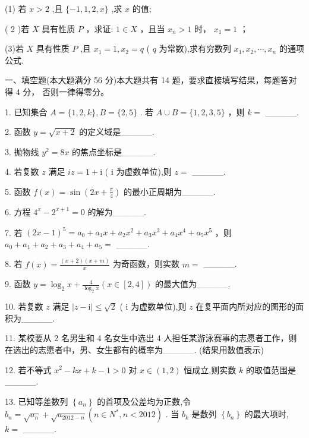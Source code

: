 \documentclass[10pt]{article}
\begin{document}
(1) 若 \(x > 2\) ,且 \(\{  - 1,1,2,x\}\) ,求 \(x\) 的值;

( 2 )若 \(X\) 具有性质 \(P\) ，求证: \(1 \in  X\) ，且当 \({x}_{n} > 1\) 时， \({x}_{1} = 1\) ；

(3)若 \(X\) 具有性质 \(P\) ,且 \({x}_{1} = 1,{x}_{2} = q\) ( \(q\) 为常数),求有穷数列 \({x}_{1},{x}_{2},\cdots ,{x}_{n}\) 的通项公式.

一、填空题(本大题满分 56 分)本大题共有 14 题，要求直接填写结果，每题答对得 4 分， 否则一律得零分。

1. 已知集合 \(A = \{ 1,2,k\} ,B = \{ 2,5\}\) . 若 \(A \cup  B = \{ 1,2,3,5\}\) ，则 \(k =\) \_\_\_\_\_.

2. 函数 \(y = \sqrt{x + 2}\) 的定义域是\_\_\_\_\_.

3. 抛物线 \({y}^{2} = {8x}\) 的焦点坐标是\_\_\_\_\_.

4. 若复数 \(z\) 满足 \({iz} = 1 + \mathrm{i}\) ( \(\mathrm{i}\) 为虚数单位),则 \(z =\) \_\_\_\_\_.

5. 函数 \(f\left( x\right)  = \sin \left( {{2x} + \frac{\pi }{4}}\right)\) 的最小正周期为\_\_\_\_\_.

6. 方程 \({4}^{x} - {2}^{x + 1} = 0\) 的解为\_\_\_\_\_.

7. 若 \({\left( 2x - 1\right) }^{5} = {a}_{0} + {a}_{1}x + {a}_{2}{x}^{2} + {a}_{3}{x}^{3} + {a}_{4}{x}^{4} + {a}_{5}{x}^{5}\) ，则 \({a}_{0} + {a}_{1} + {a}_{2} + {a}_{3} + {a}_{4} + {a}_{5} =\) \_\_\_\_\_.

8. 若 \(f\left( x\right)  = \frac{\left( {x + 2}\right) \left( {x + m}\right) }{x}\) 为奇函数，则实数 \(m =\) \_\_\_\_\_.

9. 函数 \(y = {\log }_{2}x + \frac{4}{{\log }_{2}x}\left( {x \in  \left\lbrack  {2,4}\right\rbrack  }\right)\) 的最大值为\_\_\_\_\_.

10. 若复数 \(z\) 满足 \(\left| {z - \mathrm{i}}\right|  \leq  \sqrt{2}\) ( \(\mathrm{i}\) 为虚数单位),则 \(z\) 在复平面内所对应的图形的面积为\_\_\_\_\_.

11. 某校要从 2 名男生和 4 名女生中选出 4 人担任某游泳赛事的志愿者工作，则在选出的志愿者中，男、女生都有的概率为\_\_\_\_\_. (结果用数值表示)

12. 若不等式 \({x}^{2} - {kx} + k - 1 > 0\) 对 \(x \in  \left( {1,2}\right)\) 恒成立,则实数 \(k\) 的取值范围是\_\_\_\_\_.

13. 已知等差数列 \(\left\{  {a}_{n}\right\}\) 的首项及公差均为正数,令 \({b}_{n} = \sqrt{{a}_{n}} + \sqrt{{a}_{{2012} - n}}\left( {n \in  {N}^{ * },n < {2012}}\right)\) . 当 \({b}_{k}\) 是数列 \(\left\{  {b}_{n}\right\}\) 的最大项时, \(k =\) \_\_\_\_\_.
\end{document}
